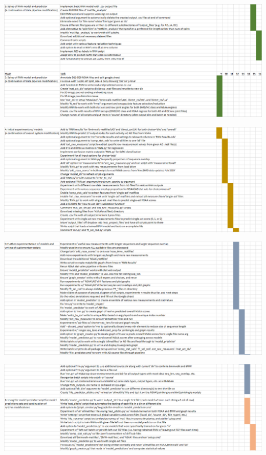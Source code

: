\documentclass[12pt,twoside]{report}
\begin{document}
\begin{center}
\includegraphics[scale=0.4]{project_figures/fig12_2}
\end{center}

\begin{center}
\includegraphics[scale=0.4]{project_figures/fig12_3}
\end{center}

\begin{center}
\includegraphics[scale=0.4]{project_figures/fig12_4}
\end{center}

\begin{center}
\includegraphics[scale=0.4]{project_figures/fig12_5}
\end{center}
\end{document}
